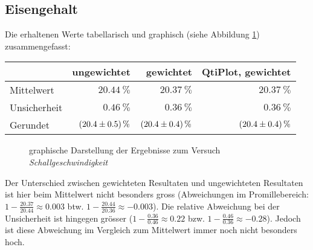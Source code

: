 \clearpage
\subsection{Eisengehalt}

Die   erhaltenen   Werte   tabellarisch   und   graphisch   (siehe   Abbildung
\ref{fig:eisengehalt:results}) zusammengefasst:

\begin{center}
\begin{tabular}{lrrr}
    \toprule
                     & ungewichtet                   & gewichtet                     & QtiPlot, gewichtet            \\
    \midrule
    Mittelwert       & $\SI{20.44}{\percent}$        & $\SI{20.37}{\percent}$        & $\SI{20.37}{\percent}$        \\
    Unsicherheit     & $\SI{ 0.46}{\percent}$        & $\SI{ 0.36}{\percent}$        & $\SI{ 0.36}{\percent}$        \\
    \midrule
    Gerundet         & $\SI{20.4 \pm 0.5}{\percent}$ & $\SI{20.4 \pm 0.4}{\percent}$ & $\SI{20.4 \pm 0.4}{\percent}$ \\
    \bottomrule
\end{tabular}
\end{center}

\vspace*{2em}
\begin{figure}[ht!]
\centering
{}
\caption{graphische Darstellung der Ergebnisse zum Versuch \emph{Schallgeschwindigkeit}}
\label{fig:eisengehalt:results}
\end{figure}

Der   Unterschied   zwischen    gewichteten   Resultaten   und   ungewichteten
Resultaten    ist    hier    beim    Mittelwert    nicht    besonders    gross
(Abweichungen   im   Promillebereich: $1-\frac{20.37}{20.44}  \approx   0.003$
btw. $1-\frac{20.44}{20.36}  \approx -0.003$).   Die  relative Abweichung  bei
der Unsicherheit  ist hingegen  gr\"osser ($1-\frac{0.36}{0.46}  \approx 0.22$
bzw. $1-\frac{0.46}{0.36} \approx -0.28$). Jedoch ist diese Abweichung im Vergleich
zum Mittelwert immer noch nicht besonders hoch.

